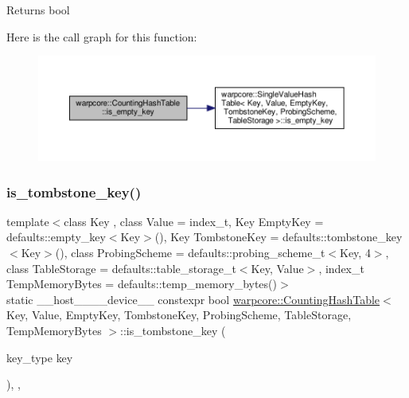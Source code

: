 \begin{DoxyReturn}{Returns}
{\ttfamily bool} 
\end{DoxyReturn}
Here is the call graph for this function\+:
\nopagebreak
\begin{figure}[H]
\begin{center}
\leavevmode
\includegraphics[width=350pt]{classwarpcore_1_1CountingHashTable_aee558df23486ead4dc8096b939b184df_cgraph}
\end{center}
\end{figure}
\mbox{\label{classwarpcore_1_1CountingHashTable_a0476fd077b63d32e3ebb5bb022bdd789}} 
\subsubsection{\texorpdfstring{is\+\_\+tombstone\+\_\+key()}{is\_tombstone\_key()}}
{\footnotesize\ttfamily template$<$class Key , class Value  = index\+\_\+t, Key Empty\+Key = defaults\+::empty\+\_\+key$<$\+Key$>$(), Key Tombstone\+Key = defaults\+::tombstone\+\_\+key$<$\+Key$>$(), class Probing\+Scheme  = defaults\+::probing\+\_\+scheme\+\_\+t$<$\+Key, 4$>$, class Table\+Storage  = defaults\+::table\+\_\+storage\+\_\+t$<$\+Key, Value$>$, index\+\_\+t Temp\+Memory\+Bytes = defaults\+::temp\+\_\+memory\+\_\+bytes()$>$ \\
static \+\_\+\+\_\+host\+\_\+\+\_\+\+\_\+\+\_\+device\+\_\+\+\_\+ constexpr bool \hyperlink{classwarpcore_1_1CountingHashTable}{warpcore\+::\+Counting\+Hash\+Table}$<$ Key, Value, Empty\+Key, Tombstone\+Key, Probing\+Scheme, Table\+Storage, Temp\+Memory\+Bytes $>$\+::is\+\_\+tombstone\+\_\+key (\begin{DoxyParamCaption}\item[{key\+\_\+type}]{key }\end{DoxyParamCaption})\hspace{0.3cm}{\ttfamily [inline]}, {\ttfamily [static]}, {\ttfamily [noexcept]}}



